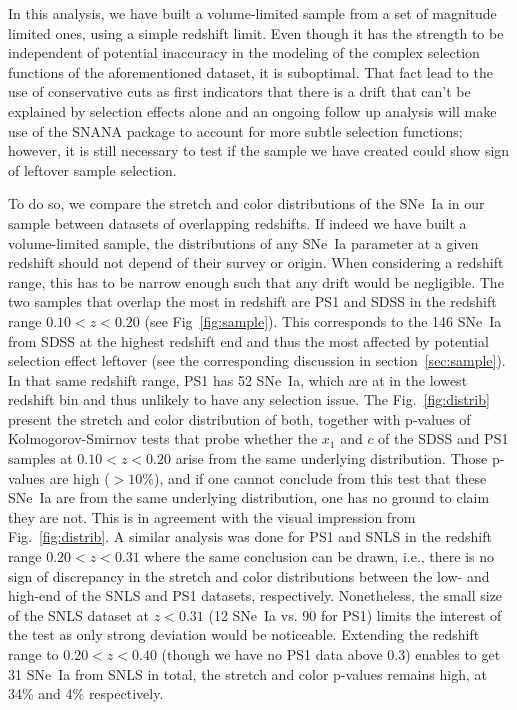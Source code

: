 \documentclass[]{aa}
\newcommand{\nn}[1]{\textcolor[rgb]{0.25, 0.50, 0}{#1}}
\begin{document}
In this analysis, we have built a volume-limited sample from a set of magnitude
limited ones, using a simple redshift limit. \nn{Even though it has the strength
to be independent of potential inaccuracy in the modeling of the complex
selection functions of the aforementioned dataset, it is suboptimal.
That fact lead to the use of conservative cuts as first indicators that there is
a drift that can't be explained by selection effects alone and a}n ongoing
follow up analysis will make use of the SNANA package \citep{SNANA} to account
for more subtle selection functions; \nn{however}, it is still necessary to test
if the sample we have created could show sign of leftover sample selection.

To do so, we compare the stretch and color distributions of the SNe~Ia in our
sample between datasets of overlapping redshifts. If indeed we have built a
volume-limited sample, the distributions of any SNe~Ia parameter at a given
redshift should not depend of their survey or origin. When considering a
redshift range, this has to be narrow enough such that any drift would be
negligible. The two samples that overlap the most in redshift are PS1 and SDSS
in the redshift range $0.10 < z < 0.20$ (see Fig~\ref{fig:sample}). This
corresponds to the 146 SNe~Ia from SDSS at the highest redshift end and thus the
most affected by potential selection effect leftover (see the corresponding
discussion in section~\ref{sec:sample}). In that same redshift range, PS1 has 52
SNe~Ia, which are at in the lowest redshift bin and thus unlikely to have any
selection issue. The Fig.~\ref{fig:distrib} present the stretch and color
distribution of both, together with p-values of Kolmogorov-Smirnov tests that
\nn{probe whether} the $x_1$ and $c$ of the SDSS and PS1 samples at $0.10 < z <
0.20$ arise from the same underlying distribution. Those p-values are high
($>10\%$), and if one cannot conclude from this test that these SNe~Ia are from
the same underlying distribution, one has no ground to claim they are not. This
is in agreement with the visual impression from Fig.~\ref{fig:distrib}. A
similar analysis \nn{was done} for PS1 and SNLS in the redshift range $0.20 < z
< 0.31$ where the same conclusion \nn{can} be drawn, i.e., there is no sign of
discrepancy in the stretch and color distributions between the low- and high-end
of the SNLS and PS1 datasets, respectively. Nonetheless, the small size of the
SNLS dataset at $z < 0.31$ (12 SNe~Ia vs. 90 for PS1) limits the interest of the
test as only strong deviation would be noticeable. Extending the redshift range
to $0.20 < z < 0.40$ (though we have no PS1 data above 0.3) enables to get 31
SNe~Ia from SNLS in total, the stretch and color p-values remains high, at 34\%
and 4\% respectively.
\end{document}
